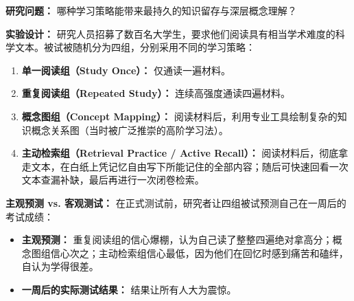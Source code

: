 \documentclass[12pt,a4paper,openany]{ctexbook}
\begin{document}
\begin{casebox}
\textbf{研究问题：} 哪种学习策略能带来最持久的知识留存与深层概念理解？

\textbf{实验设计：} 
研究人员招募了数百名大学生，要求他们阅读具有相当学术难度的科学文本。被试被随机分为四组，分别采用不同的学习策略：
\begin{enumerate}
    \item \textbf{单一阅读组（Study Once）：} 仅通读一遍材料。
    \item \textbf{重复阅读组（Repeated Study）：} 连续高强度通读四遍材料。
    \item \textbf{概念图组（Concept Mapping）：} 阅读材料后，利用专业工具绘制复杂的知识概念关系图（当时被广泛推崇的高阶学习法）。
    \item \textbf{主动检索组（Retrieval Practice / Active Recall）：} 阅读材料后，彻底拿走文本，在白纸上凭记忆自由写下所能记住的全部内容；随后可快速回看一次文本查漏补缺，最后再进行一次闭卷检索。
\end{enumerate}

\textbf{主观预测 vs. 客观测试：}
在正式测试前，研究者让四组被试预测自己在一周后的考试成绩：
\begin{itemize}
    \item \textbf{主观预测：} 重复阅读组的信心爆棚，认为自己读了整整四遍绝对拿高分；概念图组信心次之；主动检索组信心最低，因为他们在回忆时感到痛苦和磕绊，自认为学得很差。
    \item \textbf{一周后的实际测试结果：} 结果让所有人大为震惊。
\end{itemize}

\begin{figure}[H]
\centering
{}
\end{figure}
\end{casebox}
\end{document}

